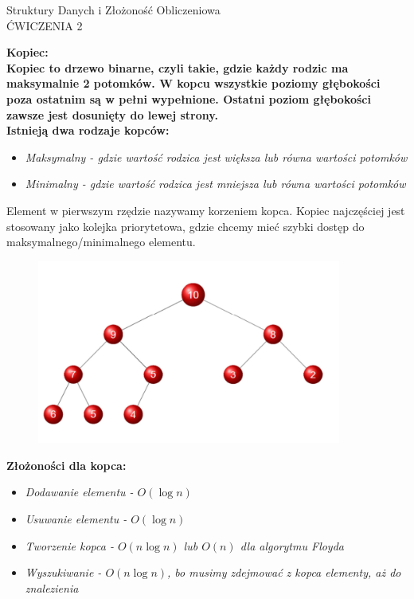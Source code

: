 \documentclass[a4paper,12pt]{article}
\newcommand{\h}[1]{\noindent \bf #1 \rm \\ \noindent}
\newcommand{\italic}[1]{\it #1 \rm}
\begin{document}
\begin{center}
	\LARGE
	Struktury Danych i Złożoność Obliczeniowa \\
	\large
	ĆWICZENIA 2 
\end{center}
\vspace{1cm}

\h{Kopiec:}
Kopiec to drzewo binarne, czyli takie, gdzie każdy rodzic ma maksymalnie 2 potomków. W kopcu wszystkie poziomy głębokości poza ostatnim są w pełni wypełnione. Ostatni poziom głębokości zawsze jest dosunięty do lewej strony.\\

\noindent
Istnieją dwa rodzaje kopców:
\begin{itemize}
	\item \italic{Maksymalny} - gdzie wartość rodzica jest większa lub równa wartości potomków
	\item \italic{Minimalny} - gdzie wartość rodzica jest mniejsza lub równa wartości potomków
\end{itemize}
\vspace{5mm}

\noindent
Element w pierwszym rzędzie nazywamy korzeniem kopca. Kopiec najczęściej jest stosowany jako kolejka priorytetowa, gdzie chcemy mieć szybki dostęp do maksymalnego/minimalnego elementu.\\

\begin{figure}[H]
	\centering
	\includegraphics[width=10cm]{fig1.png}
\end{figure}

\h{Złożoności dla kopca:}
\begin{itemize}
	\item \italic{Dodawanie elementu} - $O(\log n)$
	\item \italic{Usuwanie elementu} - $O(\log n)$
	\item \italic{Tworzenie kopca} - $O(n\log n)$ lub $O(n)$ dla algorytmu Floyda
	\item \italic{Wyszukiwanie} - $O(n\log n)$, bo musimy zdejmować z kopca elementy, aż do znalezienia
\end{itemize}
\vspace{5mm}
\end{document}

